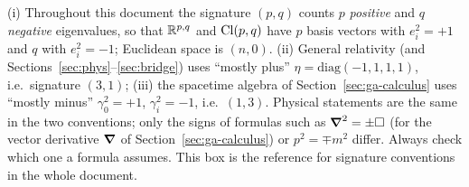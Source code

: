 \begin{pitfall}
(i) Throughout this document the signature $(p,q)$ counts $p$ \emph{positive} and $q$ \emph{negative} eigenvalues,
so that $\mathbb{R}^{p,q}$ and $\mathrm{Cl}(p,q)$ have $p$ basis vectors with $e_i^2=+1$ and $q$ with $e_i^2=-1$; Euclidean space is $(n,0)$.
(ii) General relativity (and Sections~\ref{sec:phys}--\ref{sec:bridge}) uses ``mostly plus'' $\eta=\mathrm{diag}(-1,1,1,1)$, i.e.\ signature
$(3,1)$; (iii) the spacetime algebra of Section~\ref{sec:ga-calculus} uses ``mostly minus'' $\gamma_0^2=+1$, $\gamma_i^2=-1$, i.e.\ $(1,3)$.
Physical statements are the same in the two conventions; only the signs of formulas such as $\boldsymbol{\nabla}^2=\pm\Box$ (for the vector
derivative $\boldsymbol{\nabla}$ of Section~\ref{sec:ga-calculus}) or
$p^2=\mp m^2$ differ. Always check which one a formula assumes. This box is the reference for signature conventions in the whole document.
\end{pitfall}
